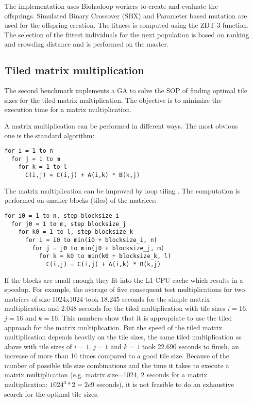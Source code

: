 The implementation uses Biohadoop workers to create and evaluate the offsprings. Simulated Binary Crossover (SBX) and Parameter based mutation \cite{deb2000efficient} are used for the offspring creation. The fitness is computed using the ZDT-3 function. The selection of the fittest individuals for the next population is based on ranking and crowding distance and is performed on the master.

\subsection{Tiled matrix multiplication}
\label{chap:evaluation:tiledmul}
The second benchmark implements a GA to solve the SOP of finding optimal tile sizes for the tiled matrix multiplication. The objective is to minimize the execution time for a matrix multiplication.

A matrix multiplication can be performed in different ways. The most obvious one is the standard algorithm:
\begin{lstlisting}
for i = 1 to n
  for j = 1 to m
    for k = 1 to l
      C(i,j) = C(i,j) + A(i,k) * B(k,j)
\end{lstlisting}

The matrix multiplication can be improved by loop tiling \cite{wolfe1989more}. The computation is performed on smaller blocks (tiles) of the matrices:
\begin{lstlisting}
for i0 = 1 to n, step blocksize_i
  for j0 = 1 to m, step blocksize_j
    for k0 = 1 to l, step blocksize_k
      for i = i0 to min(i0 + blocksize_i, n)
        for j = j0 to min(j0 + blocksize_j, m)
          for k = k0 to min(k0 + blocksize_k, l)
            C(i,j) = C(i,j) + A(i,k) * B(k,j)
\end{lstlisting}

If the blocks are small enough they fit into the L1 CPU cache which results in a speedup. For example, the average of five consequent test multiplications for two matrices of size 1024x1024 took 18.245 seconds for the simple matrix multiplication and 2.048 seconds for the tiled multiplication with tile sizes $i=16$, $j=16$ and $k=16$. This numbers show that it is appropriate to use the tiled approach for the matrix multiplication. But the speed of the tiled matrix multiplication depends heavily on the tile sizes, the same tiled multiplication as above with tile sizes of $i=1$, $j=1$ and $k=1$ took 22.690 seconds to finish, an increase of more than 10 times compared to a good tile size. Because of the number of possible tile size combinations and the time it takes to execute a matrix multiplication (e.g. matrix size=1024, 2 seconds for a matrix multiplication: $1024^3 * 2 = 2e9 $ seconds), it is not feasible to do an exhaustive search for the optimal tile sizes.

